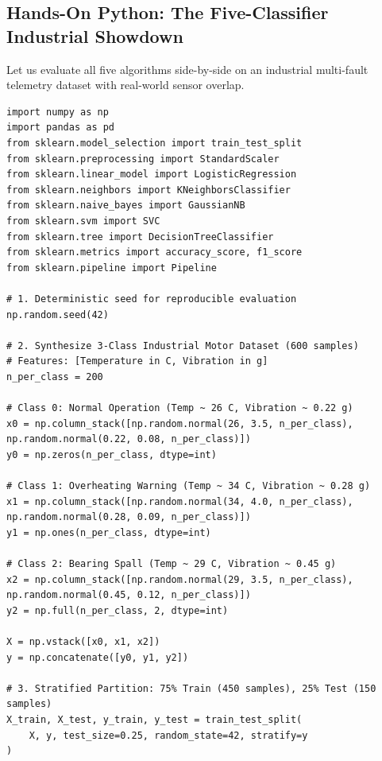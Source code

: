 \subsection{Hands-On Python: The Five-Classifier Industrial Showdown}\label{subsec:classification_python}

Let us evaluate all five algorithms side-by-side on an industrial multi-fault telemetry dataset with real-world sensor overlap.

\begin{lstlisting}[style=pythonstyle]
import numpy as np
import pandas as pd
from sklearn.model_selection import train_test_split
from sklearn.preprocessing import StandardScaler
from sklearn.linear_model import LogisticRegression
from sklearn.neighbors import KNeighborsClassifier
from sklearn.naive_bayes import GaussianNB
from sklearn.svm import SVC
from sklearn.tree import DecisionTreeClassifier
from sklearn.metrics import accuracy_score, f1_score
from sklearn.pipeline import Pipeline

# 1. Deterministic seed for reproducible evaluation
np.random.seed(42)

# 2. Synthesize 3-Class Industrial Motor Dataset (600 samples)
# Features: [Temperature in C, Vibration in g]
n_per_class = 200

# Class 0: Normal Operation (Temp ~ 26 C, Vibration ~ 0.22 g)
x0 = np.column_stack([np.random.normal(26, 3.5, n_per_class), np.random.normal(0.22, 0.08, n_per_class)])
y0 = np.zeros(n_per_class, dtype=int)

# Class 1: Overheating Warning (Temp ~ 34 C, Vibration ~ 0.28 g)
x1 = np.column_stack([np.random.normal(34, 4.0, n_per_class), np.random.normal(0.28, 0.09, n_per_class)])
y1 = np.ones(n_per_class, dtype=int)

# Class 2: Bearing Spall (Temp ~ 29 C, Vibration ~ 0.45 g)
x2 = np.column_stack([np.random.normal(29, 3.5, n_per_class), np.random.normal(0.45, 0.12, n_per_class)])
y2 = np.full(n_per_class, 2, dtype=int)

X = np.vstack([x0, x1, x2])
y = np.concatenate([y0, y1, y2])

# 3. Stratified Partition: 75% Train (450 samples), 25% Test (150 samples)
X_train, X_test, y_train, y_test = train_test_split(
    X, y, test_size=0.25, random_state=42, stratify=y
)


\end{lstlisting}
